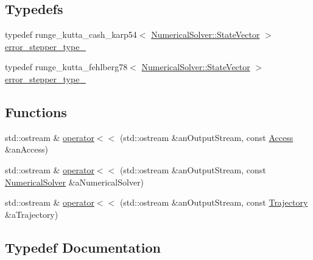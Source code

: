 \subsection*{Typedefs}
\begin{DoxyCompactItemize}
\item 
typedef runge\+\_\+kutta\+\_\+cash\+\_\+karp54$<$ \hyperlink{classostk_1_1astro_1_1_numerical_solver_a4a1673a6f74a72d6bacfe6480b9c1ccd}{Numerical\+Solver\+::\+State\+Vector} $>$ \hyperlink{namespaceostk_1_1astro_ae0e87d949c5bf8265860957bc3e551a4}{error\+\_\+stepper\+\_\+type\+\_}
\item 
typedef runge\+\_\+kutta\+\_\+fehlberg78$<$ \hyperlink{classostk_1_1astro_1_1_numerical_solver_a4a1673a6f74a72d6bacfe6480b9c1ccd}{Numerical\+Solver\+::\+State\+Vector} $>$ \hyperlink{namespaceostk_1_1astro_ac65cff551d02047f499131307bd5f688}{error\+\_\+stepper\+\_\+type\+\_}
\end{DoxyCompactItemize}
\subsection*{Functions}
\begin{DoxyCompactItemize}
\item 
std\+::ostream \& \hyperlink{namespaceostk_1_1astro_ad6bf403749e98996e2e56cd6dc8cc848}{operator$<$$<$} (std\+::ostream \&an\+Output\+Stream, const \hyperlink{classostk_1_1astro_1_1_access}{Access} \&an\+Access)
\item 
std\+::ostream \& \hyperlink{namespaceostk_1_1astro_a1504859af3ff5ed6cea30697522bbf4e}{operator$<$$<$} (std\+::ostream \&an\+Output\+Stream, const \hyperlink{classostk_1_1astro_1_1_numerical_solver}{Numerical\+Solver} \&a\+Numerical\+Solver)
\item 
std\+::ostream \& \hyperlink{namespaceostk_1_1astro_a0cb767c3814a31416e0491406bc56ed2}{operator$<$$<$} (std\+::ostream \&an\+Output\+Stream, const \hyperlink{classostk_1_1astro_1_1_trajectory}{Trajectory} \&a\+Trajectory)
\end{DoxyCompactItemize}


\subsection{Typedef Documentation}
\mbox{\label{namespaceostk_1_1astro_ae0e87d949c5bf8265860957bc3e551a4}} 
